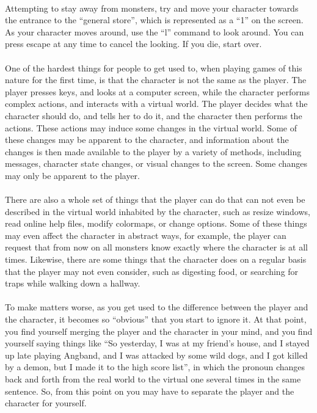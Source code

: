 \paragraph{}Attempting to stay away from monsters, try and move your character
towards the entrance to the ``general store'', which is represented as a
``1'' on the screen. As your character moves around, use the ``l'' command
to look around. You can press escape at any time to cancel the looking.
If you die, start over.

\paragraph{}One of the hardest things for people to get used to, when playing games
of this nature for the first time, is that the character is not the same
as the player. The player presses keys, and looks at a computer screen,
while the character performs complex actions, and interacts with a
virtual world. The player decides what the character should do, and
tells her to do it, and the character then performs the actions. These
actions may induce some changes in the virtual world. Some of these
changes may be apparent to the character, and information about the
changes is then made available to the player by a variety of methods,
including messages, character state changes, or visual changes to the
screen. Some changes may only be apparent to the player.

\paragraph{}There are also a whole set of things that the player can do that can not
even be described in the virtual world inhabited by the character, such
as resize windows, read online help files, modify colormaps, or change
options. Some of these things may even affect the character in abstract
ways, for example, the player can request that from now on all monsters
know exactly where the character is at all times. Likewise, there are
some things that the character does on a regular basis that the player
may not even consider, such as digesting food, or searching for traps
while walking down a hallway.

\paragraph{}To make matters worse, as you get used to the difference between the
player and the character, it becomes so ``obvious'' that you start to
ignore it. At that point, you find yourself merging the player and the
character in your mind, and you find yourself saying things like ``So
yesterday, I was at my friend's house, and I stayed up late playing
Angband, and I was attacked by some wild dogs, and I got killed by a
demon, but I made it to the high score list'', in which the pronoun
changes back and forth from the real world to the virtual one several
times in the same sentence. So, from this point on you may have to
separate the player and the character for yourself.

